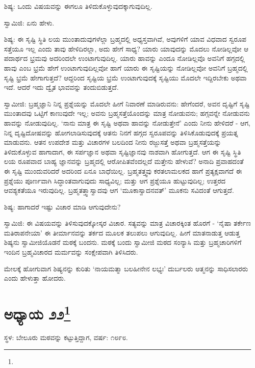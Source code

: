 ಶಿಷ್ಯ: ಒಂದು ವಿಷಯವನ್ನು ಈಗಲೂ ತಿಳಿದುಕೊಳ್ಳುವುದಕ್ಕಾಗುವುದಿಲ್ಲ.

ಸ್ವಾಮಿಜಿ: ಏನು ಹೇಳು.

ಶಿಷ್ಯ: ಈ ಸೃಷ್ಟಿ ಸ್ಥಿತಿ ಲಯ ಮುಂತಾದುವುಗಳೆಲ್ಲಾ ಬ್ರಹ್ಮದಲ್ಲಿ ಅಧ್ಯಸ್ತವಾಗಿವೆ, ಅವುಗಳಿಗೆ ಯಾವ ವಿಧವಾದ ಸ್ವರೂಪ ಸತ್ತೆಯೂ ಇಲ್ಲ ಎಂದು ತಾವು ಹೇಳಿದಿರಲ್ಲಾ, ಅದು ಹೇಗೆ ಸಾಧ್ಯ? ಯಾರು ಯಾವುದನ್ನು ಮೊದಲು ನೋಡಿಲ್ಲವೋ ಆ ಪದಾರ್ಥದ ಭ್ರಮವು ಅದರಿಂದಲೇ ಉಂಟಾಗುವುದಿಲ್ಲ. ಯಾರು ಹಾವನ್ನು ಎಂದೂ ನೋಡಿಲ್ಲವೊ ಅವನಿಗೆ ಹಗ್ಗದಲ್ಲಿ ಹಾವು ಎಂಬ ಭ್ರಮೆ ಹೇಗೆ ಉಂಟಾಗುವುದಿಲ್ಲವೋ ಹಾಗೆ ಯಾರು ಈ ಸೃಷ್ಟಿಯನ್ನು ನೋಡಿಲ್ಲವೋ ಅವನಿಗೆ ಬ್ರಹ್ಮದಲ್ಲಿ ಸೃಷ್ಟಿ ಭ್ರಮೆ ಹೇಗಾಗುತ್ತದೆ? ಆದ್ದರಿಂದ ಸೃಷ್ಟಿಯ ಭ್ರಮೆ ಉಂಟಾಗುವುದಕ್ಕೆ ಸೃಷ್ಟಿಯು ಮೊದಲೇ ಇದ್ದಿರಬೇಕು ಅಥವಾ ಇದೆ. ಆದರೆ ಇದು ದ್ವೈತ ಭಾವವನ್ನು ತಂದುಬಿಡುತ್ತದೆ.

ಸ್ವಾಮೀಜಿ: ಬ್ರಹ್ಮಜ್ಞಾನಿ ನಿನ್ನ ಪ್ರಶ್ನೆಯನ್ನು ಮೊದಲೇ ಹೀಗೆ ನಿವಾರಣೆ ಮಾಡಿರುವನು: ಹೇಗೆಂದರೆ, ಅವನ ದೃಷ್ಟಿಗೆ ಸೃಷ್ಟಿ ಮುಂತಾದವು ಒಟ್ಟಿಗೆ ಕಾಣುವುದೇ ಇಲ್ಲ; ಅವನು ಬ್ರಹ್ಮಸತ್ತೆಯೊಂದನ್ನು ಮಾತ್ರ ನೋಡುವನು; ಹಗ್ಗವನ್ನೇ ನೋಡುವನು ಹಾವನ್ನು ನೋಡುವುದಿಲ್ಲ. ‘ನಾನು ಮಾತ್ರ ಈ ಸೃಷ್ಟಿ ಅಥವಾ ಹಾವನ್ನು ನೋಡುತ್ತೇನೆ’ ಎಂದು ನೀನು ಹೇಳಿದರೆ - ಆಗ, ನಿನ್ನ ದೃಷ್ಟಿದೋಷವನ್ನು ಹೋಗಲಾಡಿಸುವುದಕ್ಕೆ ಆತನು ನಿನಗೆ ಹಗ್ಗದ ಸ್ವರೂಪವನ್ನು ತಿಳಿಸಿಕೊಡುವುದಕ್ಕೆ ಪ್ರಯತ್ನ ಮಾಡುವನು. ಆತನ ಉಪದೇಶ ಮತ್ತು ವಿಚಾರಗಳ ಬಲದಿಂದ ನೀನು ರಜ್ಜುಸತ್ತೆ ಅಥವಾ ಬ್ರಹ್ಮಸತ್ತೆಯನ್ನು ತಿಳಿದುಕೊಳ್ಳುವ ಹಾಗಾದಾಗ, ಈ ಸರ್ಪಜ್ಞಾನ ಅಥವಾ ಸೃಷ್ಟಿಜ್ಞಾನವು ನಾಶವಾಗಿ ಹೋಗುತ್ತದೆ. ಆಗ ಈ ಸೃಷ್ಟಿ ಸ್ಥಿತಿ ಲಯ ರೂಪವಾದ ಬಾಹ್ಯ ಜ್ಞಾನವನ್ನು ಬ್ರಹ್ಮದಲ್ಲಿ ಆರೋಪಿತವೆಂದಲ್ಲದೆ ಮತ್ತೇನು ಹೇಳುವೆ? ಅನಾದಿ ಪ್ರವಾಹದಂತೆ ಈ ಸೃಷ್ಟಿ ಮುಂದುವರಿದರೆ ಅದರಿಂದ ಏನೂ ಬಾಧೆಯಿಲ್ಲ. ಬ್ರಹ್ಮತತ್ತ್ವವು ಕರತಲಾಮಲಕದ ಹಾಗೆ ಪ್ರತ್ಯಕ್ಷವಾಗದೆ ಈ ಪ್ರಶ್ನೆಯು ಪೂರ್ಣವಾಗಿ ಸಿದ್ಧಾಂತವಾಗುವುದು ಸಾಧ್ಯವಿಲ್ಲ; ಮತ್ತು ಆಗ ಪ್ರಶ್ನೆಯೂ ಹುಟ್ಟುವುದಿಲ್ಲ; ಉತ್ತರದ ಆವಶ್ಯಕತೆಯೂ ಇರುವುದಿಲ್ಲ. ಬ್ರಹ್ಮತತ್ತ್ವಾಸ್ವಾದವು ಆಗ ‘ಮೂಕಾಸ್ವಾದನವತ್’ ಮೂಕನು ಸವಿದಂತೆ ಆಗುತ್ತದೆ.

ಶಿಷ್ಯ: ಹಾಗಾದರೆ ಇಷ್ಟು ವಿಚಾರ ಮಾಡಿ ಆಗುವುದೇನು?

ಸ್ವಾಮಿಜಿ: ಈ ವಿಷಯವನ್ನು ತಿಳಿಸುವುದಕ್ಕೋಸ್ಕರ ವಿಚಾರ. ಸತ್ಯವನ್ನು ಮಾತ್ರ ವಿಚಾರಕ್ಕಿಂತ ಹೊರಗೆ - ‘ನೈಷಾ ತರ್ಕೇಣ ಮತಿರಾಪನೇಯಾ’ ಈ ತೀರ್ಮಾನವನ್ನು ತರ್ಕದ ಮೂಲಕ ತಲುಪಲು ಆಗುವುದಿಲ್ಲ. ಹೀಗೆ ಮಾತನಾಡುತ್ತ ಆಡುತ್ತ ಶಿಷ್ಯನು ಸ್ವಾಮೀಜಿಯೊಡನೆ ಮಠಕ್ಕೆ ಬಂದನು. ಮಠಕ್ಕೆ ಬಂದು ಸ್ವಾಮೀಜಿ ಮಠದ ಸಂನ್ಯಾಸಿ ಮತ್ತು ಬ್ರಹ್ಮಚಾರಿಗಳಿಗೆ ಇಂದಿನ ಬ್ರಹ್ಮವಿಚಾರದ ಮರ್ಮವನ್ನು ಸಂಕ್ಷೇಪವಾಗಿ ತಿಳಿಸಿದರು.

ಮೇಲಕ್ಕೆ ಹೋಗುವಾಗ ಶಿಷ್ಯನನ್ನು ಕುರಿತು ‘ನಾಯಮತ್ಮಾ ಬಲಹೀನೇನ ಲಭ್ಯಃ’ ದುರ್ಬಲರು ಆತ್ಮನನ್ನು ಸಾಧಿಸಲಾರರು ಎಂದು ಹೇಳುತ್ತಾ ಹೋದರು.

\newpage

\chapter[ಅಧ್ಯಾಯ ೨೨]{ಅಧ್ಯಾಯ ೨೨\protect\footnote{}}

\begin{center}
ಸ್ಥಳ: ಬೇಲೂರು ಮಠವನ್ನು ಕಟ್ಟುತ್ತಿದ್ದಾಗ, ವರ್ಷ: ೧೮೯೮.
\end{center}

